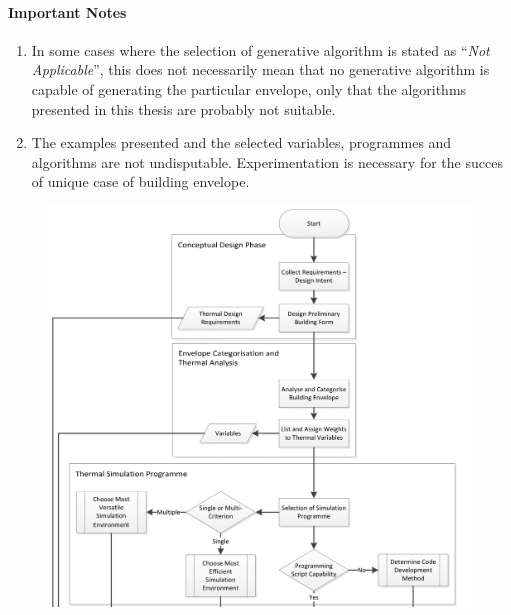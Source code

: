 \paragraph{Important Notes}\mbox{}

\vspace{-0.4cm}
\begin{enumerate}
	\item In some cases where the selection of generative algorithm is stated as ``\emph{Not Applicable}'', this does not necessarily mean that no generative algorithm is capable of generating the particular envelope, only that the algorithms presented in this thesis are probably not suitable.
	\item The examples presented and the selected variables, programmes and algorithms are not undisputable. Experimentation is necessary for the succes of unique case of building envelope.
\end{enumerate}


\clearpage
\begin{figure}
	\centering
	\includegraphics[width=18cm]{./Images/9a-Flowchart}
\end{figure}

